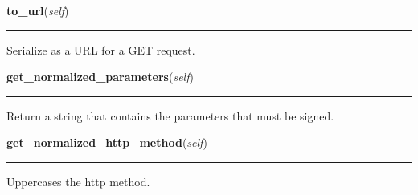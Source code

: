     \label{lib:oauth:OAuthRequest:to_url}

    \vspace{0.5ex}

\hspace{.8\funcindent}\begin{boxedminipage}{\funcwidth}

    \raggedright \textbf{to\_url}(\textit{self})

    \vspace{-1.5ex}

    \rule{\textwidth}{0.5\fboxrule}
\setlength{\parskip}{2ex}
    Serialize as a URL for a GET request.

\setlength{\parskip}{1ex}
    \end{boxedminipage}

    \label{lib:oauth:OAuthRequest:get_normalized_parameters}

    \vspace{0.5ex}

\hspace{.8\funcindent}\begin{boxedminipage}{\funcwidth}

    \raggedright \textbf{get\_normalized\_parameters}(\textit{self})

    \vspace{-1.5ex}

    \rule{\textwidth}{0.5\fboxrule}
\setlength{\parskip}{2ex}
    Return a string that contains the parameters that must be signed.

\setlength{\parskip}{1ex}
    \end{boxedminipage}

    \label{lib:oauth:OAuthRequest:get_normalized_http_method}

    \vspace{0.5ex}

\hspace{.8\funcindent}\begin{boxedminipage}{\funcwidth}

    \raggedright \textbf{get\_normalized\_http\_method}(\textit{self})

    \vspace{-1.5ex}

    \rule{\textwidth}{0.5\fboxrule}
\setlength{\parskip}{2ex}
    Uppercases the http method.

\setlength{\parskip}{1ex}
    \end{boxedminipage}

